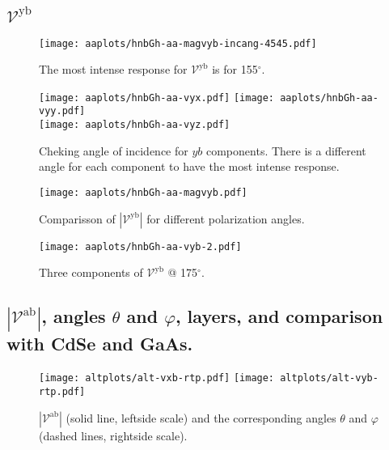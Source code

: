 \documentclass{article}
\let\Oldsubsection\subsection
\renewcommand{\subsection}{\FloatBarrier\Oldsubsection}
\begin{document}
\clearpage

\subsection{$\mathcal{V}^{\mathrm{yb}} $}
\begin{figure}[h!]
    \centering
    \texttt{[image: aaplots/hnbGh-aa-magvyb-incang-4545.pdf]}
    \caption{The most intense response for $\mathcal{V}^{\mathrm{yb}} $ is for 
    155$^{\circ}$.}
    \label{fig:aa-magvybincang}
\end{figure}
\begin{figure}[h!]
    \centering
    \texttt{[image: aaplots/hnbGh-aa-vyx.pdf]}
    \texttt{[image: aaplots/hnbGh-aa-vyy.pdf]}\\
    \texttt{[image: aaplots/hnbGh-aa-vyz.pdf]}
    \caption{Cheking angle of incidence for $yb$ components. There is a
    different angle for each component to have the most intense response.}
    \label{fig:aa-ybangcomp}
\end{figure}
\begin{figure}[ht!]
    \centering
    \texttt{[image: aaplots/hnbGh-aa-magvyb.pdf]}
    \caption{Comparisson of $|\mathcal{V}^{\mathrm{yb}}|$ for different
    polarization angles.}
    \label{fig:aa-magvyb}
\end{figure}
\begin{figure}[t!]
    \centering
    \texttt{[image: aaplots/hnbGh-aa-vyb-2.pdf]}
    \caption{Three components of $\mathcal{V}^{\mathrm{yb}} $ @ 175$^{\circ}$.}
    \label{fig:aa-vyb2}
\end{figure}

\clearpage

\subsection{$|\mathcal{V}^{\mathrm{ab}}|$, angles
$\theta$ and $\varphi$, layers, and comparison with CdSe and GaAs.}
\begin{figure}[ht]
    \centering
    \texttt{[image: altplots/alt-vxb-rtp.pdf]}
    \texttt{[image: altplots/alt-vyb-rtp.pdf]}
    \caption{$|\mathcal{V}^{\mathrm{ab}}|$ (solid line, leftside scale) and the
    corresponding angles $\theta$ and $\varphi$ (dashed lines, rightside scale).}
    \label{fig:aa-rtp}
\end{figure}
\end{document}
